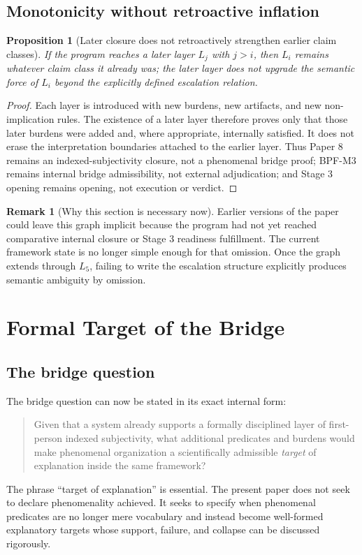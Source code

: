 \documentclass[11pt,a4paper]{article}
\newtheorem{proposition}[theorem]{Proposition}
\theoremstyle{definition}
\newtheorem{remark}[theorem]{Remark}
\begin{document}
\subsection{Monotonicity without retroactive inflation}
\begin{proposition}[Later closure does not retroactively strengthen earlier claim classes]
If the program reaches a later layer $L_j$ with $j>i$, then $L_i$ remains whatever claim class it already was; the later layer does not upgrade the semantic force of $L_i$ beyond the explicitly defined escalation relation.
\end{proposition}

\begin{proof}
Each layer is introduced with new burdens, new artifacts, and new non-implication rules. The existence of a later layer therefore proves only that those later burdens were added and, where appropriate, internally satisfied. It does not erase the interpretation boundaries attached to the earlier layer. Thus Paper 8 remains an indexed-subjectivity closure, not a phenomenal bridge proof; BPF-M3 remains internal bridge admissibility, not external adjudication; and Stage 3 opening remains opening, not execution or verdict.
\end{proof}

\begin{remark}[Why this section is necessary now]
Earlier versions of the paper could leave this graph implicit because the program had not yet reached comparative internal closure or Stage 3 readiness fulfillment. The current framework state is no longer simple enough for that omission. Once the graph extends through $L_5$, failing to write the escalation structure explicitly produces semantic ambiguity by omission.
\end{remark}
\section{Formal Target of the Bridge}
\subsection{The bridge question}
The bridge question can now be stated in its exact internal form:
\begin{quote}
Given that a system already supports a formally disciplined layer of first-person indexed subjectivity, what additional predicates and burdens would make phenomenal organization a scientifically admissible \emph{target} of explanation inside the same framework?
\end{quote}
The phrase ``target of explanation'' is essential. The present paper does not seek to declare phenomenality achieved. It seeks to specify when phenomenal predicates are no longer mere vocabulary and instead become well-formed explanatory targets whose support, failure, and collapse can be discussed rigorously.
\end{document}
